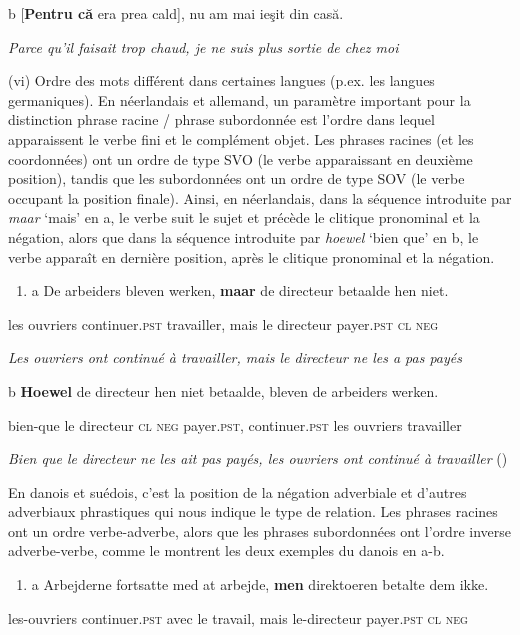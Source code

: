   b  [\textbf{Pentru că} era prea cald], nu am mai ieşit din casă.

{\itshape
Parce qu'il faisait trop chaud, je ne suis plus sortie de chez moi}

(vi) Ordre des mots différent dans certaines langues (p.ex. les langues germaniques). En néerlandais et allemand, un paramètre important pour la distinction phrase racine / phrase subordonnée est l'ordre dans lequel apparaissent le verbe fini et le complément objet. Les phrases racines (et les coordonnées) ont un ordre de type SVO (le verbe apparaissant en deuxième position), tandis que les subordonnées ont un ordre de type SOV (le verbe occupant la position finale). Ainsi, en néerlandais, dans la séquence introduite par \textit{maar} `mais' en a, le verbe suit le sujet et précède le clitique pronominal et la négation, alors que dans la séquence introduite par \textit{hoewel} `bien que' en b, le verbe apparaît en dernière position, après le clitique pronominal et la négation.  


\begin{enumerate}
\item \label{bkm:Ref300187099}a  De  arbeiders  bleven  werken,  \textbf{maar}  de  directeur  betaalde  hen  niet.


\end{enumerate}
les  ouvriers  continuer.\textsc{pst}  travailler,  mais  le  directeur  payer.\textsc{pst  cl  neg}  

{\itshape
Les ouvriers ont continué à travailler, mais le directeur ne les a pas payés}

  b  \textbf{Hoewel}  de  directeur  hen  niet  betaalde,  bleven  de  arbeiders  werken.

    bien-que  le  directeur  \textsc{cl  neg}  payer.\textsc{pst, } continuer.\textsc{pst}  les  ouvriers  travailler

    \textit{Bien que le directeur ne les ait pas payés, les ouvriers ont continué à travailler                       } (\citet[612]{Verstraete2005})

En danois et suédois, c'est la position de la négation adverbiale et d'autres adverbiaux phrastiques qui nous indique le type de relation. Les phrases racines ont un ordre verbe-adverbe, alors que les phrases subordonnées ont l'ordre inverse adverbe-verbe, comme le montrent les deux exemples du danois en a-b.


\begin{enumerate}
\item \label{bkm:Ref300187381}a  Arbejderne  fortsatte  med  at  arbejde,  \textbf{men}  direktoeren  betalte  dem ikke.


\end{enumerate}
les-ouvriers  continuer.\textsc{pst}  avec  le  travail,  mais  le-directeur  payer.\textsc{pst cl  neg}  

